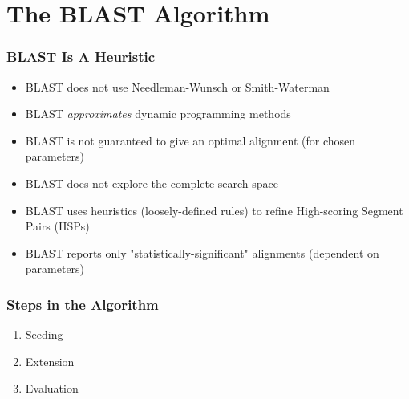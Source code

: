 \documentclass[table]{beamer}
\begin{document}


    \section{The BLAST Algorithm}
    \begin{frame}
     \frametitle{BLAST Is A Heuristic}
     \begin{itemize}
       \item<1-> BLAST does not use Needleman-Wunsch or Smith-Waterman
       \item<1-> BLAST \emph{approximates} dynamic programming methods
       \item<1-> BLAST is not guaranteed to give an optimal alignment (for chosen parameters)
       \item<2-> BLAST does not explore the complete search space
       \item<3-> BLAST uses heuristics (loosely-defined rules) to refine High-scoring Segment Pairs (HSPs)
       \item<4-> BLAST reports only "statistically-significant" alignments (dependent on parameters)
     \end{itemize}
   \end{frame}

  \begin{frame}
    \frametitle{Steps in the Algorithm}
    \begin{enumerate}
      \item Seeding
      \item Extension
      \item Evaluation
    \end{enumerate}
  \end{frame}
\end{document}
